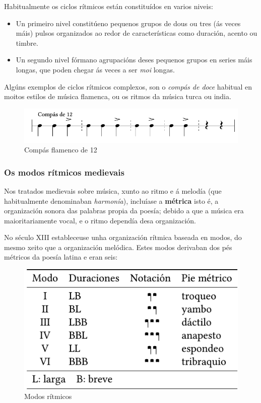 \documentclass[spanish, a4paper,nobind]{templates/ociamthesis}
\providecommand{\tightlist}{%
  \setlength{\itemsep}{0pt}\setlength{\parskip}{0pt}}
\begin{document}
Habitualmente os ciclos rítmicos están constituídos en varios niveis:

\begin{itemize}
\tightlist
\item
  Un primeiro nivel constitúeno pequenos grupos de dous ou tres (ás veces máis) pulsos organizados ao redor de características como duración, acento ou timbre.
\item
  Un segundo nivel fórmano agrupacións deses pequenos grupos en series máis longas, que poden chegar ás veces a ser \emph{moi} longas.
\end{itemize}

Algúns exemplos de ciclos rítmicos complexos, son o \emph{compás de doce} habitual en moitos estilos de música flamenca, ou os ritmos da música turca ou india.

\begin{figure}
\centering
\includegraphics{figures/ud-03/ciclos-1.png}
\caption{Compás flamenco de 12}
\end{figure}

\hypertarget{os-modos-ruxedtmicos-medievais}{%
\subsubsection*{Os modos rítmicos medievais}\label{os-modos-ruxedtmicos-medievais}}

Nos tratados medievais sobre música, xunto ao ritmo e á melodía (que habitualmente denominaban \emph{harmonía}), incluíase a \textbf{métrica} isto é, a organización sonora das palabras propia da poesía; debido a que a música era maioritariamente vocal, e o ritmo dependía desa organización.

No século XIII estableceuse unha organización rítmica baseada en modos, do mesmo xeito que a organización melódica. Estes modos derivaban dos pés métricos da poesía latina e eran seis:

\begin{figure}
\centering
\includegraphics{figures/ud-03/modosritmicos.png}
\caption{Modos rítmicos}
\end{figure}
\end{document}
